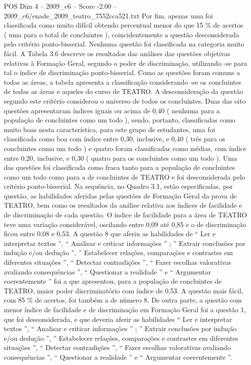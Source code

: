 \begin{textsample}{POS Dim 4 – 2009\_c6 – Score -2.00 – 2009\_c6/enade\_2009\_teatro\_7552cca521.txt}
Por fim, apenas uma foi classificada como muito difícil obtendo percentual menor do que 15 \% de acertos ( uma para o total de concluintes ), coincidentemente a questão desconsiderada pelo critério ponto-bisserial.
Nenhuma questão foi classificada na categoria muito fácil.
A Tabela 3.6 descreve os resultados das análises das questões objetivas relativas à Formação Geral, segundo o poder de discriminação, utilizando -se para tal o índice de discriminação ponto-bisserial.
Como as questões foram comuns a todas as áreas, a tabela apresenta a classificação considerando -se os concluintes de todas as áreas e aqueles do curso de TEATRO.
A desconsideração da questão segundo este critério considerou o universo de todos os concluintes.
Duas das oito questões apresentaram índices iguais ou acima de 0,40 ( nenhuma para a população de concluintes como um todo ), sendo, portanto, classificadas como muito boas nesta característica, para este grupo de estudantes, uma foi classificada como boa com índice entre 0,30, inclusive, e 0,40 ( três para os concluintes como um todo ) e quatro foram classificadas como médias, com índice entre 0,20, inclusive, e 0,30 ( quatro para os concluintes como um todo ).
Uma das questões foi classificada como fraca tanto para a população de concluintes como um todo como para a de concluintes de TEATRO e foi desconsiderada pelo critério ponto-bisserial.
Na sequência, no Quadro 3.1, estão especificadas, por questão, as habilidades aferidas pelas questões de Formação Geral da prova de TEATRO, bem como os resultados da análise relativa aos índices de facilidade e de discriminação de cada questão.
O índice de facilidade para a área de TEATRO teve uma variação considerável, oscilando entre 0,09 até 0,85 e o de discriminação ficou entre 0,08 e 0,53.
A questão 8 que aferiu as habilidades de “ Ler e interpretar textos ”, “ Analisar e criticar informações ” ; ” Extrair conclusões por indução e/ou dedução ”, ” Estabelecer relações, comparações e contrastes em diferentes situações ”, “ Detectar contradições ”, “ Fazer escolhas valorativas avaliando consequências ”, “ Questionar a realidade ” e “ Argumentar coerentemente ” foi a que apresentou, para a população de concluintes de TEATRO, maior poder discriminatório com índice de 0,53.
A questão mais fácil, com 85 \% de acertos, foi também a de número 8.
De outra parte, a questão com menor índice de facilidade e de discriminação em Formação Geral foi a questão 1, que foi desconsiderada, e que deveria aferir as habilidades “ Ler e interpretar textos ”, “ Analisar e criticar informações ” ; ” Extrair conclusões por indução e/ou dedução ”, ” Estabelecer relações, comparações e contrastes em diferentes situações ”, “ Detectar contradições ”, “ Fazer escolhas valorativas avaliando consequências ”, “ Questionar a realidade ” e “ Argumentar coerentemente ”.

\end{textsample}
